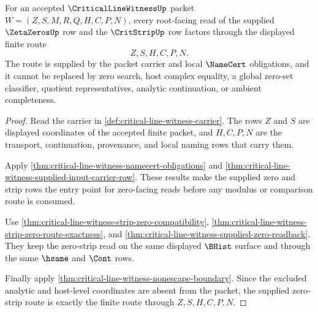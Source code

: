 \begin{theorem}
\label{thm:critical-line-witness-supplied-zero-strip-route}
For an accepted $\CriticalLineWitnessUp$ packet $W=(Z,S,M,R,Q,H,C,P,N)$, every root-facing read of the supplied $\ZetaZerosUp$ row and the $\CritStripUp$ row factors through the displayed finite route
$$
Z,S,H,C,P,N.
$$
The route is supplied by the packet carrier and local $\NameCert$ obligations, and it cannot be replaced by zero search, host complex equality, a global zero-set classifier, quotient representatives, analytic continuation, or ambient completeness.
\end{theorem}
\begin{proof}
Read the carrier in \autoref{def:critical-line-witness-carrier}. The rows $Z$ and $S$ are displayed coordinates of the accepted finite packet, and $H,C,P,N$ are the transport, continuation, provenance, and local naming rows that carry them.

Apply \autoref{thm:critical-line-witness-namecert-obligations} and \autoref{thm:critical-line-witness-supplied-input-carrier-row}. These results make the supplied zero and strip rows the entry point for zero-facing reads before any modulus or comparison route is consumed.

Use \autoref{thm:critical-line-witness-strip-zero-compatibility}, \autoref{thm:critical-line-witness-strip-zero-route-exactness}, and \autoref{thm:critical-line-witness-supplied-zero-readback}. They keep the zero-strip read on the same displayed $\BHist$ surface and through the same $\hsame$ and $\Cont$ rows.

Finally apply \autoref{thm:critical-line-witness-nonescape-boundary}. Since the excluded analytic and host-level coordinates are absent from the packet, the supplied zero-strip route is exactly the finite route through $Z,S,H,C,P,N$.
\end{proof}

